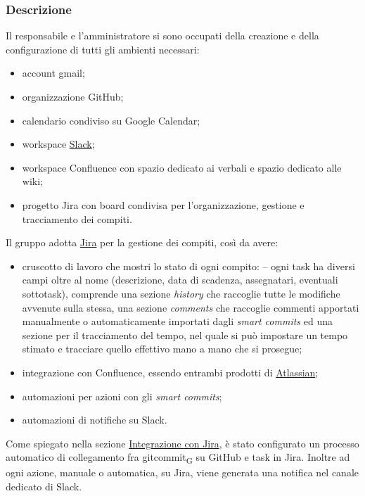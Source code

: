     \subsubsection{Descrizione}
    Il responsabile e l'amministratore si sono occupati della creazione e della configurazione di tutti gli ambienti necessari:
    \begin{itemize}
        \item account gmail;
        \item organizzazione GitHub;
        \item calendario condiviso su Google Calendar;
        \item workspace \href{https://slack.com/intl/en-it/about}{Slack};
        \item workspace Confluence con spazio dedicato ai verbali e spazio dedicato alle wiki;
        \item progetto Jira con board condivisa per l'organizzazione, gestione e tracciamento dei compiti.
    \end{itemize}
        Il gruppo adotta \href{https://www.atlassian.com/software/jira}{Jira} per la gestione dei compiti, così da avere:
        \begin{itemize}
            \item cruscotto di lavoro che mostri lo stato di ogni compito:
                \subitem -- ogni task ha diversi campi oltre al nome (descrizione, data di scadenza, assegnatari, eventuali sottotask), comprende una sezione \textit{history} che raccoglie tutte le modifiche avvenute sulla stessa, una sezione \textit{comments} che raccoglie commenti apportati manualmente o automaticamente importati dagli \textit{smart commits} ed una sezione per il tracciamento del tempo, nel quale si può impostare un tempo stimato e tracciare quello effettivo mano a mano che si prosegue;
            \item integrazione con Confluence, essendo entrambi prodotti di \href{https://www.atlassian.com/}{Atlassian};
            \item automazioni per azioni con gli \textit{smart commits};
            \item automazioni di notifiche su Slack.
        \end{itemize}
        Come spiegato nella sezione \hyperref[jiraintegration]{Integrazione con Jira}, è stato configurato un processo automatico di collegamento fra \gls{gitcommit}\textsubscript{G} su GitHub e task in Jira. Inoltre ad ogni azione, manuale o automatica, su Jira, viene generata una notifica nel canale dedicato di Slack.
